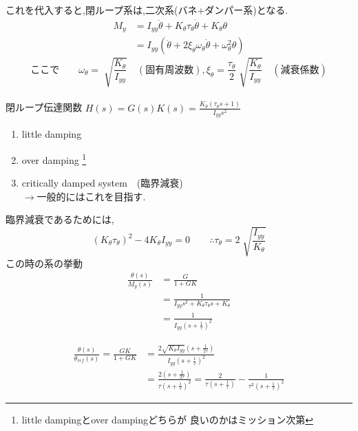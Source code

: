\documentclass[class=article, crop=false, dvipdfmx]{standalone}
\begin{document}
これを代入すると,閉ループ系は,二次系(バネ+ダンパー系)となる.
\begin{align}
M_y
&=
I_{yy}\ddot{\theta}+
K_{\theta}\tau_{\theta}\dot{\theta}+K_{\theta}\theta
\\
&=
I_{yy}
(\ddot{\theta}+
2\xi_{\theta}\omega_{\theta}\dot{\theta}
+\omega^2_{\theta}\theta)
\end{align}
\begin{equation}
\text{ここで}
\qquad
\omega_{\theta}=
\sqrt[]{\frac{K_{\theta}}{I_{yy}}}\quad
(\text{固有周波数}),
\xi_{\theta}=
\frac{\tau_{\theta}}{2}
\sqrt[]{\frac{K_{\theta}}{I_{yy}}}
\quad( \text{減衰係数})
\end{equation}
\\		%
閉ループ伝達関数
$
H(s)=G(s)K(s)=
\frac{K_{\theta}(\tau_{\theta}s+1)}{I_{yy}s^2}
$


\begin{enumerate}[label=\maru{\theenumi}]
\item little damping
\item over damping
\footnote{little dampingとover dampingどちらが
良いのかはミッション次第}
\item critically damped system　(臨界減衰)\\
$\rightarrow$一般的にはこれを目指す.
\end{enumerate}
臨界減衰であるためには,
\begin{equation}
(K_{\theta}\tau_{\theta})^2
-4K_{\theta}I_{yy}=0\qquad
\therefore
\tau_{\theta}=2
\sqrt[]{\frac{I_{yy}}{K_{\theta}}}
\end{equation}
この時の系の挙動
\begin{align}
\frac{\theta(s)}{M_{y}(s)}&=\frac{G}{1+GK}\\
&=
\frac{1}
{I_{yy}s^2+K_{\theta}\tau_{\theta}s+K_{\theta}}\\
&=
\frac{1}{I_{yy}(s+\frac{1}{\tau})^2}
\end{align}

\begin{align}
\frac{\theta (s)}{\theta_{ref} (s)}
= \frac{GK}{1+GK}
&= \frac{2 \sqrt{K_{\theta} I_{yy}}(s+\frac{1}{2\tau})}
{I_{yy}(s+\frac{1}{\tau})^2}\\
&=\frac{2(s+\frac{1}{2\tau})}{\tau (s+\frac{1}{\tau})^2}
=\frac{2}{\tau (s+\frac{1}{\tau})}
-\frac{1}{\tau^2 (s+\frac{1}{\tau})^2}
\end{align}
\end{document}
